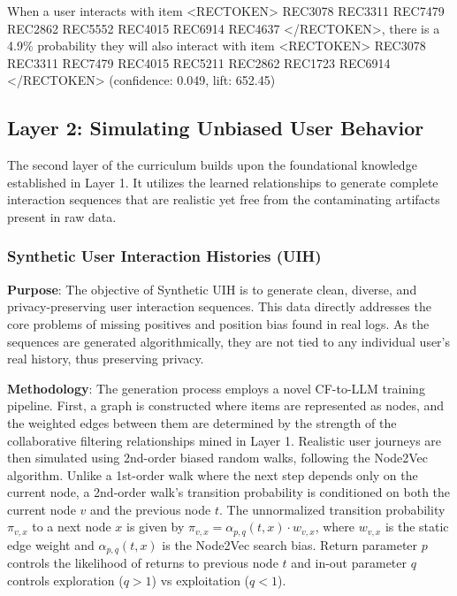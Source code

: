 \documentclass[]{fairmeta}
\begin{document}
\begin{boxA}
When a user interacts with item <RECTOKEN> REC3078 REC3311 REC7479 REC2862 REC5552 REC4015 
REC6914 REC4637 </RECTOKEN>, there is a 4.9\% probability they will also interact with item 
<RECTOKEN> REC3078 REC3311 REC7479 REC4015 REC5211 REC2862 REC1723 REC6914 </RECTOKEN> 
(confidence: 0.049, lift: 652.45)
\end{boxA}

\subsection{Layer 2: Simulating Unbiased User Behavior}
The second layer of the curriculum builds upon the foundational knowledge established in Layer 1. It utilizes the learned relationships to generate complete interaction sequences that are realistic yet free from the contaminating artifacts present in raw data.
\subsubsection{Synthetic User Interaction Histories (UIH)}
\textbf{Purpose}: The objective of Synthetic UIH is to generate clean, diverse, and privacy-preserving user interaction sequences. This data directly addresses the core problems of missing positives and position bias found in real logs. As the sequences are generated algorithmically, they are not tied to any individual user's real history, thus preserving privacy.

\textbf{Methodology}: The generation process employs a novel CF-to-LLM training pipeline. First, a graph is constructed where items are represented as nodes, and the weighted edges between them are determined by the strength of the collaborative filtering relationships mined in Layer 1. Realistic user journeys are then simulated using 2nd-order biased random walks, following the Node2Vec \cite{grover2016node2vecscalablefeaturelearning} algorithm. Unlike a 1st-order walk where the next step depends only on the current node, a 2nd-order walk's transition probability is conditioned on both the current node $v$ and the previous node $t$. The unnormalized transition probability $\pi_{v,x}$ to a next node $x$ is given by $\pi_{v,x} = \alpha_{p,q}(t, x) \cdot w_{v,x}$, where $w_{v,x}$ is the static edge weight and $\alpha_{p,q}(t, x)$ is the Node2Vec search bias. Return parameter $p$ controls the likelihood of returns to previous node $t$ and in-out parameter $q$ controls exploration ($q>1$) vs exploitation ($q<1$).
\end{document}
